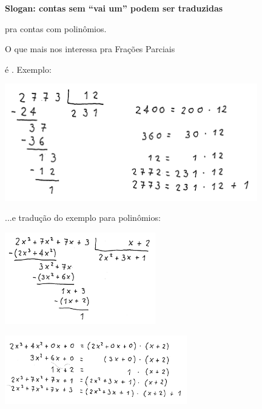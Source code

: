 \documentclass[oneside,12pt]{article}
\begin{document}
{\bf Slogan: contas sem ``vai um'' podem ser traduzidas

pra contas com polinômios.}

\ssk

O que mais nos interessa pra Frações Parciais

é . Exemplo:

\includegraphics[width=11cm]{2020-1-C2/20201118_C2_div_com_resto_1.pdf}

\newpage


...e tradução do exemplo para polinômios:

\includegraphics[height=4cm]{2020-1-C2/20201118_C2_div_com_resto_2.pdf}

\includegraphics[height=3cm]{2020-1-C2/20201118_C2_div_com_resto_3.pdf}

\newpage

\end{document}
